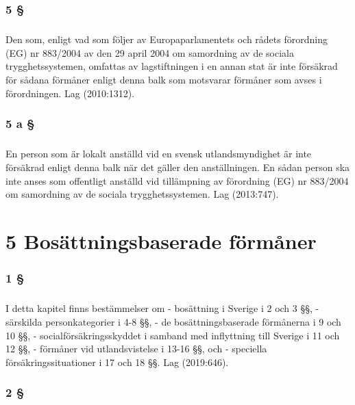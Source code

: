 \documentclass[a4paper,notitlepage,openany,10pt]{book}
\begin{document}
\subsection*{5 §}
\paragraph*{}
Den som, enligt vad som följer av Europaparlamentets och rådets förordning (EG) nr 883/2004 av den 29 april 2004 om samordning av de sociala trygghetssystemen, omfattas av lagstiftningen i en annan stat är inte försäkrad för sådana förmåner enligt denna balk som motsvarar förmåner som avses i förordningen.
Lag (2010:1312).
\subsection*{5 a §}
\paragraph*{}
En person som är lokalt anställd vid en svensk utlandsmyndighet är inte försäkrad enligt denna balk när det gäller den anställningen. En sådan person ska inte anses som offentligt anställd vid tillämpning av förordning (EG) nr 883/2004 om samordning av de sociala trygghetssystemen.
Lag (2013:747).
\chapter*{5 Bosättningsbaserade förmåner}
\subsection*{1 §}
\paragraph*{}
I detta kapitel finns bestämmelser om
\newline - bosättning i Sverige i 2 och 3 §§,
\newline - särskilda personkategorier i 4-8 §§,
\newline - de bosättningsbaserade förmånerna i 9 och 10 §§,
\newline - socialförsäkringsskyddet i samband med inflyttning till Sverige i 11 och 12 §§,
\newline - förmåner vid utlandsvistelse i 13-16 §§, och
\newline - speciella försäkringssituationer i 17 och 18 §§.
Lag (2019:646).
\subsection*{2 §}
\end{document}
